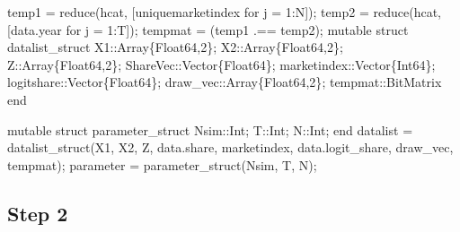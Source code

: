 \documentclass[
  letterpaper,
  DIV=11,
  numbers=noendperiod]{scrreprt}
\newenvironment{Shaded}{\begin{snugshade}}{\end{snugshade}}
\newcommand{\CharTok}[1]{\textcolor[rgb]{0.13,0.47,0.30}{#1}}
\newcommand{\DataTypeTok}[1]{\textcolor[rgb]{0.68,0.00,0.00}{#1}}
\newcommand{\FloatTok}[1]{\textcolor[rgb]{0.68,0.00,0.00}{#1}}
\newcommand{\FunctionTok}[1]{\textcolor[rgb]{0.28,0.35,0.67}{#1}}
\newcommand{\KeywordTok}[1]{\textcolor[rgb]{0.00,0.23,0.31}{#1}}
\newcommand{\NormalTok}[1]{\textcolor[rgb]{0.00,0.23,0.31}{#1}}
\newcommand{\OperatorTok}[1]{\textcolor[rgb]{0.37,0.37,0.37}{#1}}
\begin{document}
\begin{Shaded}
\begin{Highlighting}[]
\NormalTok{temp1 }\OperatorTok{=} \FunctionTok{reduce}\NormalTok{(hcat, [uniquemarketindex for j }\OperatorTok{=} \FloatTok{1}\OperatorTok{:}\NormalTok{N])}\CharTok{\textquotesingle{};}
\NormalTok{temp2 }\OperatorTok{=} \FunctionTok{reduce}\NormalTok{(hcat, [data.year for j }\OperatorTok{=} \FloatTok{1}\OperatorTok{:}\NormalTok{T]);}
\NormalTok{tempmat }\OperatorTok{=}\NormalTok{ (temp1 }\OperatorTok{.==}\NormalTok{ temp2);}
\KeywordTok{mutable struct}\NormalTok{ datalist\_struct}
\NormalTok{    X1}\OperatorTok{::}\DataTypeTok{Array\{Float64,2\}}\NormalTok{;}
\NormalTok{    X2}\OperatorTok{::}\DataTypeTok{Array\{Float64,2\}}\NormalTok{;}
\NormalTok{    Z}\OperatorTok{::}\DataTypeTok{Array\{Float64,2\}}\NormalTok{;}
\NormalTok{    ShareVec}\OperatorTok{::}\DataTypeTok{Vector\{Float64\}}\NormalTok{;}
\NormalTok{    marketindex}\OperatorTok{::}\DataTypeTok{Vector\{Int64\}}\NormalTok{;}
\NormalTok{    logitshare}\OperatorTok{::}\DataTypeTok{Vector\{Float64\}}\NormalTok{;}
\NormalTok{    draw\_vec}\OperatorTok{::}\DataTypeTok{Array\{Float64,2\}}\NormalTok{;}
\NormalTok{    tempmat}\OperatorTok{::}\DataTypeTok{BitMatrix}
\KeywordTok{end}

\KeywordTok{mutable struct}\NormalTok{ parameter\_struct}
\NormalTok{    Nsim}\OperatorTok{::}\DataTypeTok{Int}\NormalTok{;}
\NormalTok{    T}\OperatorTok{::}\DataTypeTok{Int}\NormalTok{;}
\NormalTok{    N}\OperatorTok{::}\DataTypeTok{Int}\NormalTok{;}
\KeywordTok{end}
\NormalTok{datalist }\OperatorTok{=} \FunctionTok{datalist\_struct}\NormalTok{(X1, X2, Z, data.share, marketindex, data.logit\_share, draw\_vec, tempmat);}
\NormalTok{parameter }\OperatorTok{=} \FunctionTok{parameter\_struct}\NormalTok{(Nsim, T, N);}
\end{Highlighting}
\end{Shaded}

\hypertarget{step-2}{%
\subsection{Step 2}\label{step-2}}
\end{document}
